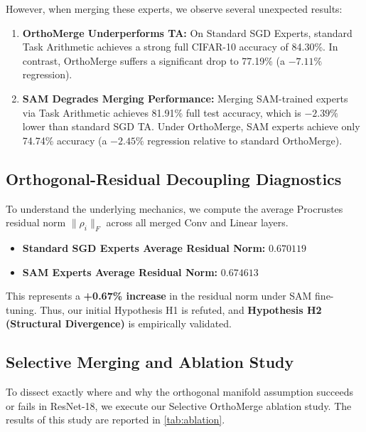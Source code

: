 \documentclass{article}
\begin{document}
However, when merging these experts, we observe several unexpected results:
\begin{enumerate}
    \item \textbf{OrthoMerge Underperforms TA:} On Standard SGD Experts, standard Task Arithmetic achieves a strong full CIFAR-10 accuracy of 84.30\%. In contrast, OrthoMerge suffers a significant drop to 77.19\% (a $-7.11\%$ regression).
    \item \textbf{SAM Degrades Merging Performance:} Merging SAM-trained experts via Task Arithmetic achieves 81.91\% full test accuracy, which is $-2.39\%$ lower than standard SGD TA. Under OrthoMerge, SAM experts achieve only 74.74\% accuracy (a $-2.45\%$ regression relative to standard OrthoMerge).
\end{enumerate}

\subsection{Orthogonal-Residual Decoupling Diagnostics}
To understand the underlying mechanics, we compute the average Procrustes residual norm $\|\rho_i\|_F$ across all merged Conv and Linear layers. 
\begin{itemize}
    \item \textbf{Standard SGD Experts Average Residual Norm:} $0.670119$
    \item \textbf{SAM Experts Average Residual Norm:} $0.674613$
\end{itemize}
This represents a \textbf{+0.67\% increase} in the residual norm under SAM fine-tuning. 
Thus, our initial Hypothesis H1 is refuted, and \textbf{Hypothesis H2 (Structural Divergence)} is empirically validated.

\subsection{Selective Merging and Ablation Study}
To dissect exactly where and why the orthogonal manifold assumption succeeds or fails in ResNet-18, we execute our Selective OrthoMerge ablation study. 
The results of this study are reported in \cref{tab:ablation}.
\end{document}

